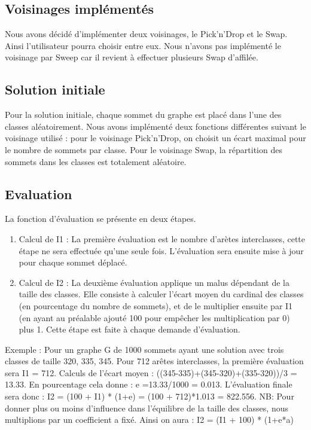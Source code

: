 \documentclass[12pt]{article}
\begin{document}
\subsection{Voisinages implémentés}
Nous avons décidé d’implémenter deux voisinages, le Pick’n'Drop et le Swap. Ainsi l’utilisateur pourra choisir entre eux.
    Nous n’avons pas implémenté le voisinage par Sweep car il revient à effectuer plusieurs Swap d’affilée.

\subsection{Solution initiale}

Pour la solution initiale, chaque sommet du graphe est placé dans l’une des classes aléatoirement. Nous avons implémenté deux fonctions différentes suivant le voisinage utilisé : pour le voisinage Pick'n'Drop, on choisit un écart maximal pour le nombre de sommets par classe. Pour le voisinage Swap, la répartition des sommets dans les classes est totalement aléatoire.

\subsection{Evaluation}

La fonction d’évaluation se présente en deux étapes.

\begin{enumerate}
\item  Calcul de I1 : La première évaluation est le nombre d’arètes interclasses, cette étape ne sera effectuée qu’une seule fois. L’évaluation sera ensuite mise à jour pour chaque sommet déplacé.

\item Calcul de I2 : La deuxième évaluation applique un malus dépendant de la taille des classes. Elle consiste à calculer l’écart moyen du cardinal des classes (en pourcentage du nombre de sommets), et de le multiplier ensuite par I1 (en ayant au préalable ajouté 100 pour empêcher les multiplication par 0) plus 1. Cette étape est faite à chaque demande d’évaluation.
\end{enumerate}

Exemple : Pour un graphe G de 1000 sommets ayant une solution avec trois classes de taille 320, 335, 345.
Pour 712 arêtes interclasses, la première évaluation sera I1 = 712.
Calculs de l’écart moyen : ((345-335)+(345-320)+(335-320))/3 = 13.33.
En pourcentage cela donne : e =13.33/1000 = 0.013.
L’évaluation finale sera donc : I2 = (100 + I1) * (1+e) = (100 + 712)*1.013 = 822.556.
NB: Pour donner plus ou moins d’influence dans l’équilibre de la taille des classes, nous multiplions par un coefficient a fixé. Ainsi on aura : I2 = (I1 + 100) * (1+e*a)
\end{document}
